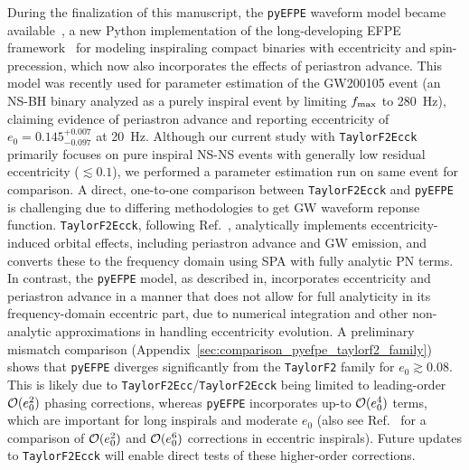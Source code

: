 \documentclass[aps,prd,twocolumn,superscriptaddress,groupedaddress,nofootinbib,showpacs,eqsecnum,useAms]{revtex4-2}
\begin{document}
During the finalization of this manuscript, the \texttt{pyEFPE} waveform model became available~\cite{Morras2025a}, a new Python implementation of the long-developing EFPE framework~\cite{Klein2010, Klein_2018, Klein2021} for modeling inspiraling compact binaries with eccentricity and spin-precession, which now also incorporates the effects of periastron advance.
This model was recently used for parameter estimation of the GW200105 event (an NS-BH binary analyzed as a purely inspiral event by limiting $f_{\rm max}$ to 280~Hz), claiming evidence of periastron advance and reporting eccentricity of $e_0 = 0.145^{+0.007}_{-0.097}$ at 20~Hz\cite{Morras2025b}. Although our current study with \texttt{TaylorF2Ecck} primarily focuses on pure inspiral NS-NS events with generally low residual eccentricity ($\lesssim 0.1$), we performed a parameter estimation run on same event for comparison. A direct, one-to-one comparison between \texttt{TaylorF2Ecck} and \texttt{pyEFPE} is challenging due to differing methodologies to get GW waveform reponse function.
\texttt{TaylorF2Ecck}, following Ref.~\cite{TGHH}, analytically implements eccentricity-induced orbital effects, including periastron advance and GW emission, and converts these to the frequency domain using SPA with fully analytic PN terms. In contrast, the \texttt{pyEFPE} model, as described in\cite{Morras2025a}, incorporates eccentricity and periastron advance in a manner that does not allow for full analyticity in its frequency-domain eccentric part, due to numerical integration and other non-analytic approximations in handling eccentricity evolution. 
A preliminary mismatch comparison (Appendix~\ref{sec:comparison_pyefpe_taylorf2_family}) shows that \texttt{pyEFPE} diverges significantly from the \texttt{TaylorF2} family for $e_0 \gtrsim 0.08$. This is likely due to \texttt{TaylorF2Ecc}/\texttt{TaylorF2Ecck} being limited to leading-order ${\cal O}(e_0^2)$ phasing corrections, whereas \texttt{pyEFPE} incorporates up-to ${\cal O}(e_0^4)$ terms, which are important for long inspirals and moderate $e_0$ (also see Ref.~\cite{TGHH} for a comparison of ${\cal O}(e_0^2)$ and ${\cal O}(e_0^6)$ corrections in eccentric inspirals). Future updates to \texttt{TaylorF2Ecck} will enable direct tests of these higher-order corrections.
\end{document}
